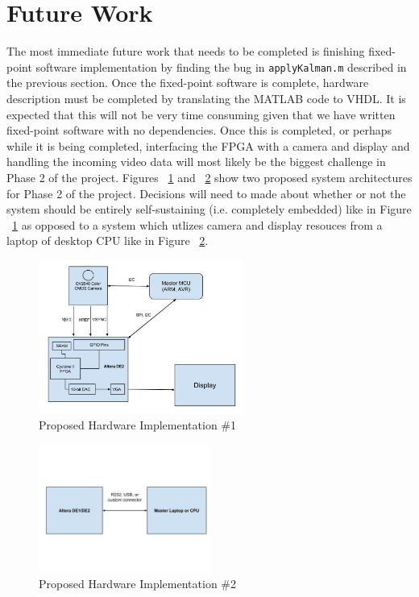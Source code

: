 \documentclass[12pt]{article} %
\begin{document}
\section{Future Work}
The most immediate future work that needs to be completed is finishing fixed-point software implementation by finding the bug in \texttt{applyKalman.m} described in the previous section. Once the fixed-point software is complete, hardware description must be completed by translating the MATLAB code to VHDL. It is expected that this will not be very time consuming given that we have written fixed-point software with no dependencies. Once this is completed, or perhaps while it is being completed, interfacing the FPGA with a camera and display and handling the incoming video data will most likely be the biggest challenge in Phase 2 of the project. Figures ~\ref{fig:hw1} and ~\ref{fig:hw2} show two proposed system architectures for Phase 2 of the project. Decisions will need to made about whether or not the system should be entirely self-sustaining (i.e. completely embedded) like in Figure ~\ref{fig:hw1} as opposed to a system which utlizes camera and display resouces from a laptop of desktop CPU like in Figure ~\ref{fig:hw2}.
\begin{figure}[h]
\centering
\includegraphics[width=0.6\textwidth]{./images/hw_layout_1.jpg}
\caption{Proposed Hardware Implementation \#1}
\label{fig:hw1}    
\end{figure}
\begin{figure}[h]
\centering
\includegraphics[width=0.5\textwidth]{./images/hw_layout_2.jpg}
\caption{Proposed Hardware Implementation \#2}
\label{fig:hw2}    
\end{figure}
\end{document}
